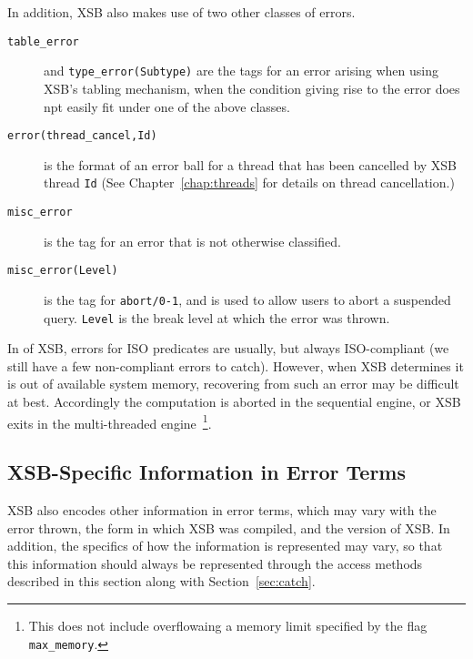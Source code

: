 \noindent
In addition, XSB also makes use of two other classes of errors.
%
\begin{description}
\item[{\tt table\_error}] and {\tt type\_error(Subtype)} are the tags for an
  error arising when using XSB's tabling mechanism, when the condition
  giving rise to the error does npt easily fit under one of the above
  classes.
%
\item[{\tt error(thread\_cancel,Id)}] is the format of an error ball for a
  thread that has been cancelled by XSB thread {\tt Id} (See
  Chapter~\ref{chap:threads} for details on thread cancellation.)
%
\item[{\tt misc\_error}] is the tag for an error that is not
  otherwise classified.
%
\item[{\tt misc\_error(Level)}] is the tag for {\tt abort/0-1}, and is
  used to allow users to abort a suspended query.  {\tt Level} is the
  break level at which the error was thrown.
%
\end{description}

In \version{} of XSB, errors for ISO predicates are usually, but
always ISO-compliant (we still have a few non-compliant errors to
catch).  However, when XSB determines it is out of available system
memory, recovering from such an error may be difficult at best.
Accordingly the computation is aborted in the sequential engine, or
XSB exits in the multi-threaded engine~\footnote{This does not include
  overflowaing a memory limit specified by the flag {\tt
    max\_memory}.}.

\subsection{XSB-Specific Information in Error Terms}

XSB also encodes other information in error terms, which may vary with
the error thrown, the form in which XSB was compiled, and the version
of XSB.  In addition, the specifics of how the information is
represented may vary, so that this information should always be
represented through the access methods described in this section along
with Section~\ref{sec:catch}.

